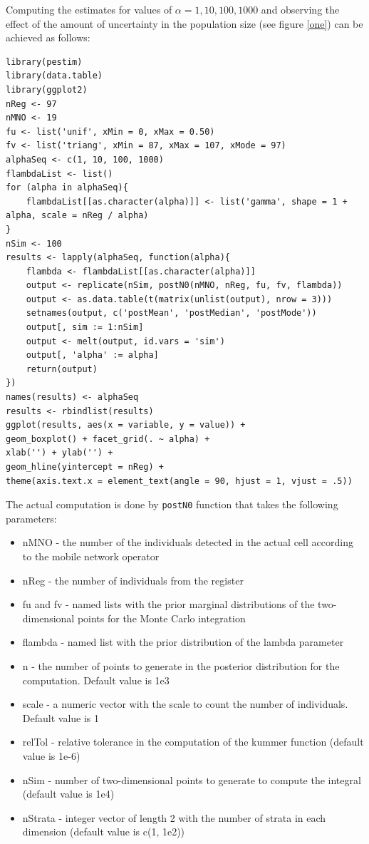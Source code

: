 \documentclass[12pt, a4paper]{article}
\begin{document}
Computing the estimates for values of $\alpha=1,10,100,1000$ and observing the effect of the amount of 
uncertainty in the population size (see figure \ref{one}) can be achieved as follows:

\begin{verbatim}
library(pestim)
library(data.table)
library(ggplot2)
nReg <- 97
nMNO <- 19
fu <- list('unif', xMin = 0, xMax = 0.50)
fv <- list('triang', xMin = 87, xMax = 107, xMode = 97)
alphaSeq <- c(1, 10, 100, 1000)
flambdaList <- list()
for (alpha in alphaSeq){
    flambdaList[[as.character(alpha)]] <- list('gamma', shape = 1 + alpha, scale = nReg / alpha)	
}
nSim <- 100
results <- lapply(alphaSeq, function(alpha){
    flambda <- flambdaList[[as.character(alpha)]]
    output <- replicate(nSim, postN0(nMNO, nReg, fu, fv, flambda))
    output <- as.data.table(t(matrix(unlist(output), nrow = 3)))
    setnames(output, c('postMean', 'postMedian', 'postMode'))
    output[, sim := 1:nSim]
    output <- melt(output, id.vars = 'sim')
    output[, 'alpha' := alpha]
    return(output)
})
names(results) <- alphaSeq
results <- rbindlist(results)
ggplot(results, aes(x = variable, y = value)) + 
geom_boxplot() + facet_grid(. ~ alpha) + 
xlab('') + ylab('') + 
geom_hline(yintercept = nReg) + 
theme(axis.text.x = element_text(angle = 90, hjust = 1, vjust = .5))
\end{verbatim}

The actual computation is done by \texttt{postN0} function that takes the following parameters:
\begin{itemize}
\item nMNO - the number of the individuals detected in the actual cell according to the mobile network operator
\item nReg - the number of individuals from the register
\item fu and fv - named lists with the prior marginal distributions of the two-dimensional points for the Monte Carlo integration
\item flambda - named list with the prior distribution of the lambda parameter
\item n - the number of points to generate in the posterior distribution for the computation. Default value is 1e3
\item scale - a numeric vector with the scale to count the number of individuals. Default value is 1
\item relTol - relative tolerance in the computation of the kummer function (default value is 1e-6)
\item nSim - number of two-dimensional points to generate to compute the integral (default value is 1e4)
\item nStrata - integer vector of length 2 with the number of strata in each dimension (default value is c(1, 1e2))
\end{itemize}
\end{document}
